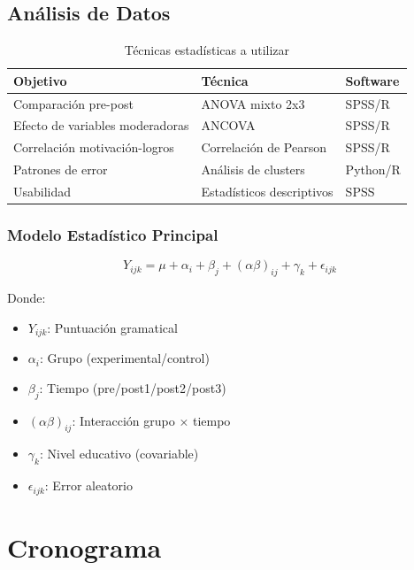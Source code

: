 \documentclass[12pt,a4paper]{article}
\begin{document}
\subsection{Análisis de Datos}

\begin{table}[H]
\centering
\caption{Técnicas estadísticas a utilizar}
\begin{tabular}{|l|l|l|}
\hline
\textbf{Objetivo} & \textbf{Técnica} & \textbf{Software} \\
\hline
Comparación pre-post & ANOVA mixto 2x3 & SPSS/R \\
Efecto de variables moderadoras & ANCOVA & SPSS/R \\
Correlación motivación-logros & Correlación de Pearson & SPSS/R \\
Patrones de error & Análisis de clusters & Python/R \\
Usabilidad & Estadísticos descriptivos & SPSS \\
\hline
\end{tabular}
\end{table}

\subsubsection{Modelo Estadístico Principal}

\begin{equation}
Y_{ijk} = \mu + \alpha_i + \beta_j + (\alpha\beta)_{ij} + \gamma_k + \epsilon_{ijk}
\end{equation}

Donde:
\begin{itemize}
    \item $Y_{ijk}$: Puntuación gramatical
    \item $\alpha_i$: Grupo (experimental/control)
    \item $\beta_j$: Tiempo (pre/post1/post2/post3)
    \item $(\alpha\beta)_{ij}$: Interacción grupo × tiempo
    \item $\gamma_k$: Nivel educativo (covariable)
    \item $\epsilon_{ijk}$: Error aleatorio
\end{itemize}

\section{Cronograma}
\end{document}
